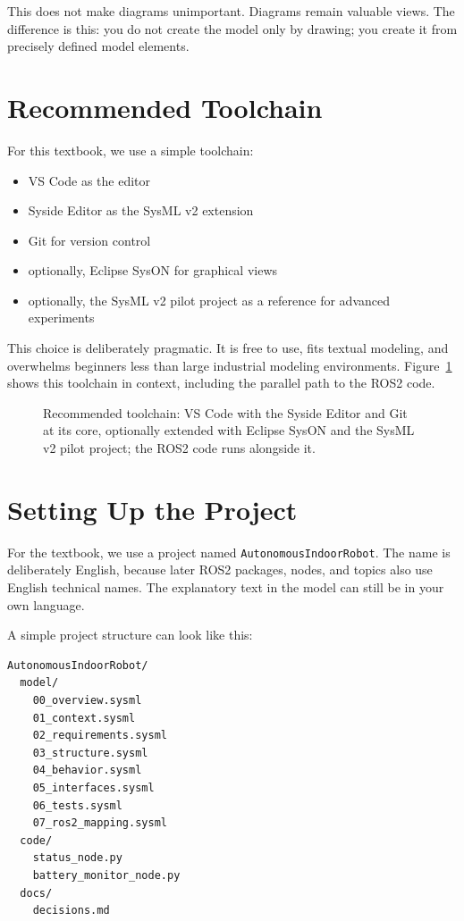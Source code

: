 This does not make diagrams unimportant. Diagrams remain valuable views. The difference is this: you do not create the model only by drawing; you create it from precisely defined model elements.

\section{Recommended Toolchain}
For this textbook, we use a simple toolchain:

\begin{itemize}
    \item VS Code as the editor
    \item Syside Editor as the SysML v2 extension
    \item Git for version control
    \item optionally, Eclipse SysON for graphical views
    \item optionally, the SysML v2 pilot project as a reference for advanced experiments
\end{itemize}

This choice is deliberately pragmatic. It is free to use, fits textual modeling, and overwhelms beginners less than large industrial modeling environments. Figure~\ref{fig:kap04-werkzeugkette} shows this toolchain in context, including the parallel path to the ROS2 code.

\begin{figure}[H]
  \centering
  \caption{Recommended toolchain: VS Code with the Syside Editor and Git at its core, optionally extended with Eclipse SysON and the SysML v2 pilot project; the ROS2 code runs alongside it.}
  \label{fig:kap04-werkzeugkette}
\end{figure}

\section{Setting Up the Project}
For the textbook, we use a project named \texttt{AutonomousIndoorRobot}. The name is deliberately English, because later ROS2 packages, nodes, and topics also use English technical names. The explanatory text in the model can still be in your own language.

A simple project structure can look like this:

\begin{lstlisting}[style=plaintext]
AutonomousIndoorRobot/
  model/
    00_overview.sysml
    01_context.sysml
    02_requirements.sysml
    03_structure.sysml
    04_behavior.sysml
    05_interfaces.sysml
    06_tests.sysml
    07_ros2_mapping.sysml
  code/
    status_node.py
    battery_monitor_node.py
  docs/
    decisions.md
\end{lstlisting}

